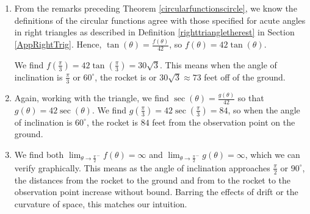 \documentclass{ximera}
\begin{document}
\begin{example}
\begin{explanation}
\begin{image}
\end{image}
\begin{enumerate}

\item  From the remarks preceding Theorem \ref{circularfunctionscircle}, we know the definitions of the circular functions agree with those specified for acute angles in right triangles as described in  Definition \ref{righttriangletherest} in Section \ref{AppRightTrig}.  Hence, $\tan(\theta) = \frac{f(\theta)}{42}$, so $f(\theta) = 42 \tan(\theta)$. 



We find $f\left( \frac{\pi}{3} \right) =  42 \tan\left( \frac{\pi}{3} \right) = 30 \sqrt{3}$.  This means when the angle of inclination is $\frac{\pi}{3}$ or $60^{\circ}$, the rocket is  or $30 \sqrt{3} \approx 73$ feet off of the ground.

\item Again, working with the triangle, we find $\sec(\theta) = \frac{g(\theta)}{42}$ so that $g(\theta) = 42 \sec(\theta)$.  We find $g\left( \frac{\pi}{3} \right) = 42 \sec\left( \frac{\pi}{3} \right) = 84$, so when the angle of inclination is $60^{\circ}$, the rocket is $84$ feet from the observation point on the ground.

\item We find both $\lim_{\theta \rightarrow \frac{\pi}{2}^{-}} f(\theta) = \infty$ and $\lim_{\theta \rightarrow \frac{\pi}{2}^{-}} g(\theta) = \infty$, which we can verify graphically.  This means as the angle of inclination approaches $\frac{\pi}{2}$ or $90^{\circ}$,  the distances from the rocket to the ground and from to the rocket to the observation point increase without bound.   Barring the effects of drift or the curvature of space, this matches our intuition. 


\end{enumerate}
\end{explanation}

\end{example}
\end{document}
